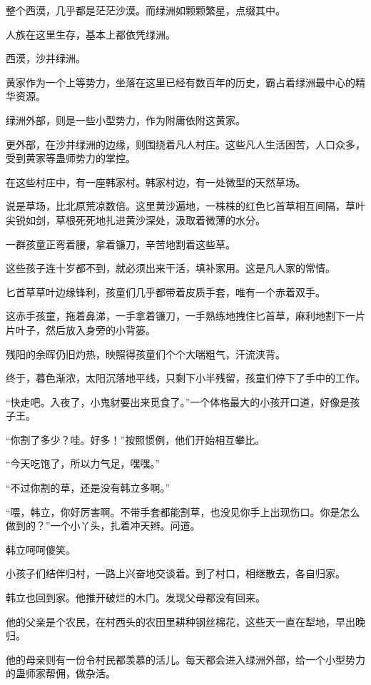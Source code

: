 
\begin{this_body}

整个西漠，几乎都是茫茫沙漠。而绿洲如颗颗繁星，点缀其中。

人族在这里生存，基本上都依凭绿洲。

西漠，沙井绿洲。

黄家作为一个上等势力，坐落在这里已经有数百年的历史，霸占着绿洲最中心的精华资源。

绿洲外部，则是一些小型势力，作为附庸依附这黄家。

更外部，在沙井绿洲的边缘，则围绕着凡人村庄。这些凡人生活困苦，人口众多，受到黄家等蛊师势力的掌控。

在这些村庄中，有一座韩家村。韩家村边，有一处微型的天然草场。

说是草场，比北原荒凉数倍。这里黄沙遍地，一株株的红色匕首草相互间隔，草叶尖锐如剑，草根死死地扎进黄沙深处，汲取着微薄的水分。

一群孩童正弯着腰，拿着镰刀，辛苦地割着这些草。

这些孩子连十岁都不到，就必须出来干活，填补家用。这是凡人家的常情。

匕首草草叶边缘锋利，孩童们几乎都带着皮质手套，唯有一个赤着双手。

这赤手孩童，拖着鼻涕，一手拿着镰刀，一手熟练地拽住匕首草，麻利地割下一片片叶子，然后放入身旁的小背篓。

残阳的余晖仍旧灼热，映照得孩童们个个大喘粗气，汗流浃背。

终于，暮色渐浓，太阳沉落地平线，只剩下小半残留，孩童们停下了手中的工作。

“快走吧。入夜了，小鬼豺要出来觅食了。”一个体格最大的小孩开口道，好像是孩子王。

“你割了多少？哇。好多！”按照惯例，他们开始相互攀比。

“今天吃饱了，所以力气足，嘿嘿。”

“不过你割的草，还是没有韩立多啊。”

“喂，韩立，你好厉害啊。不带手套都能割草，也没见你手上出现伤口。你是怎么做到的？”一个小丫头，扎着冲天辫。问道。

韩立呵呵傻笑。

小孩子们结伴归村，一路上兴奋地交谈着。到了村口，相继散去，各自归家。

韩立也回到家。他推开破烂的木门。发现父母都没有回来。

他的父亲是个农民，在村西头的农田里耕种钢丝棉花，这些天一直在犁地，早出晚归。

他的母亲则有一份令村民都羡慕的活儿。每天都会进入绿洲外部，给一个小型势力的蛊师家帮佣，做杂活。


\end{this_body}

